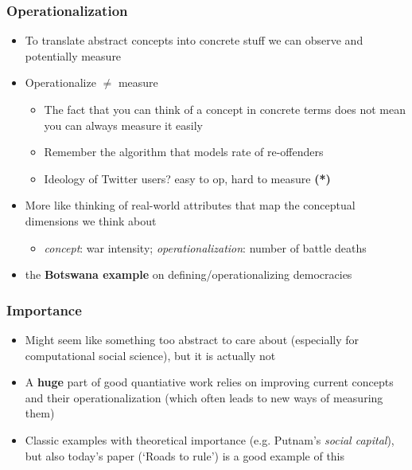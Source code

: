 \documentclass[aspectratio=43]{beamer}
\begin{document}
\begin{frame}
\frametitle{Operationalization}
\centering

\begin{itemize}
  \item To translate abstract concepts into concrete stuff we can observe and potentially measure
  \item Operationalize $\neq$ measure
  \begin{itemize}
    \item The fact that you can think of a concept in concrete terms does not mean you can always measure it easily
    \item Remember the algorithm that models rate of re-offenders
    \item Ideology of Twitter users? easy to op, hard to measure \textbf{(*)}
  \end{itemize}
  \item<2-> More like thinking of real-world attributes that map the conceptual dimensions we think about
  \begin{itemize}
    \item \textit{concept}: war intensity; \textit{operationalization}: number of battle deaths
  \end{itemize}
  \item<2-> the \textbf{Botswana example} on defining/operationalizing democracies
\end{itemize}

\end{frame}

\begin{frame}
\frametitle{Importance}
\centering

\begin{itemize}
  \item Might seem like something too abstract to care about (especially for computational social science), but it is actually not
  \item A \textbf{huge} part of good quantiative work relies on improving current concepts and their operationalization (which often leads to new ways of measuring them)
  \item Classic examples with theoretical importance (e.g. Putnam's \textit{social capital}), but also today's paper (`Roads to rule') is a good example of this
\end{itemize}

\end{frame}
\end{document}

